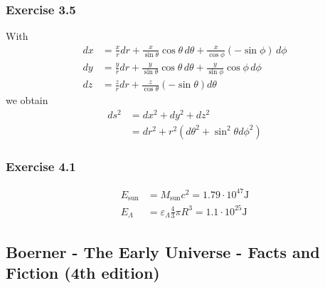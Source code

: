 \documentclass[10pt,a4paper]{book}
\theoremstyle{definition}
\begin{document}
\subsubsection{Exercise 3.5}
With
\begin{align}
dx&=\frac{x}{r}dr+\frac{x}{\sin\theta}\cos\theta\,d\theta+\frac{x}{\cos\phi}(-\sin\phi)\,d\phi\\
dy&=\frac{y}{r}dr+\frac{y}{\sin\theta}\cos\theta\,d\theta+\frac{y}{\sin\phi}\cos\phi\,d\phi\\
dz&=\frac{z}{r}dr+\frac{z}{\cos\theta}(-\sin\theta)d\theta
\end{align}
we obtain
\begin{align}
ds^2&=dx^2+dy^2+dz^2\\
&=dr^2+r^2(d\theta^2+\sin^2\theta d\phi^2)
\end{align}

\subsubsection{Exercise 4.1}
\begin{align}
E_\text{sun}&=M_\text{sun}c^2=1.79\cdot10^{47}\text{J}\\
E_\Lambda&=\varepsilon_\Lambda\frac{4}{3}\pi R^3=1.1\cdot10^{25}\text{J}
\end{align}



\subsection{{\sc Boerner} - The Early Universe - Facts and Fiction (4th edition)}
\end{document}
